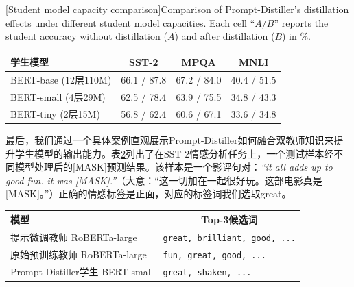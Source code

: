 \documentclass[../main.tex]{subfiles}
\begin{document}
\begin{table}[htbp]
	\centering
	[Student model capacity comparison]{Comparison of Prompt-Distiller's distillation effects under different student model capacities. Each cell “$A/B$” reports the student accuracy without distillation ($A$) and after distillation ($B$) in \%.}
	\label{tab:model-scale}
	\small\begin{tabular}{l|ccc}
		\toprule[1pt]
		\textbf{学生模型}       & \textbf{SST-2} & \textbf{MPQA} & \textbf{MNLI} \\
		\midrule[0.5pt]
		BERT-base (12层110M) & 66.1 / 87.8    & 67.2 / 84.0   & 40.4 / 51.5   \\
		BERT-small (4层29M)  & 62.5 / 78.4    & 63.9 / 75.5   & 34.8 / 43.3   \\
		BERT-tiny (2层15M)   & 56.8 / 62.4    & 60.6 / 67.1   & 33.6 / 34.8   \\
		\bottomrule[1pt]
	\end{tabular}
\end{table}

\label{sec:ch3-5-5-case-study}
最后，我们通过一个具体案例直观展示Prompt-Distiller如何融合双教师知识来提升学生模型的输出能力。表\ref{tab:case-study}列出了在SST-2情感分析任务上，一个测试样本经不同模型处理后的[MASK]预测结果。该样本是一个影评句对：\textit{“it all adds up to good fun. it was [MASK].”}（大意：“这一切加在一起很好玩。这部电影真是[MASK]。”）正确的情感标签是正面，对应的标签词我们选取great。

\begin{table}[htbp]
	\centering
	\label{tab:case-study}
	\small\begin{tabular}{l|p{6cm}}
		\toprule[1pt]
		\textbf{模型}                   & \multicolumn{1}{c}{\textbf{Top-3候选词}}       \\
		\midrule[0.5pt]
		提示微调教师 RoBERTa-large          & \texttt{\small great, brilliant, good, ...} \\
		原始预训练教师 RoBERTa-large         & \texttt{\small fun, great, good, ...}       \\
		Prompt-Distiller学生 BERT-small & \texttt{\small great, shaken, ...}          \\
		\bottomrule[1pt]
	\end{tabular}
\end{table}
\end{document}
